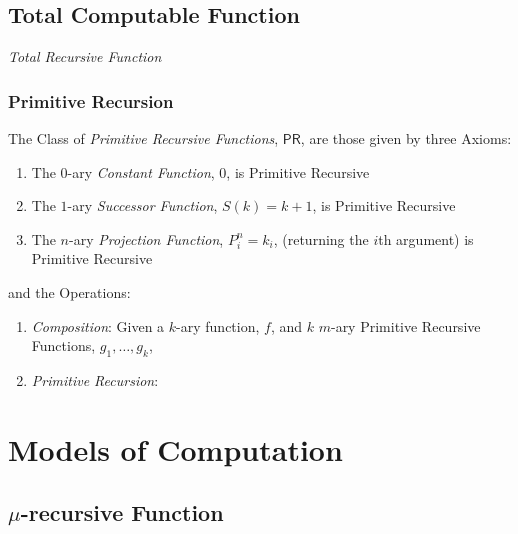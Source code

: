 \documentclass{article}
\begin{document}
\subsection{Total Computable Function}\label{subsec:recursive_function}

\emph{Total Recursive Function}

\subsubsection{Primitive Recursion}\label{subsec:primitive_recursion}

The Class of \emph{Primitive Recursive Functions}, $\mathsf{PR}$, are
those given by three Axioms:
\begin{enumerate}
    \item The $0$-ary \emph{Constant Function}, $0$, is Primitive
      Recursive
    \item The $1$-ary \emph{Successor Function}, $S(k) = k + 1$, is
      Primitive Recursive
    \item The $n$-ary \emph{Projection Function}, $P_i^n = k_i$,
      (returning the $i$th argument) is Primitive Recursive
\end{enumerate}
and the Operations:
\begin{enumerate}
    \item \emph{Composition}: Given a $k$-ary function, $f$, and $k$
      $m$-ary Primitive Recursive Functions, $g_1, \ldots, g_k$,
    \item \emph{Primitive Recursion}:
\end{enumerate}



\section{Models of Computation}\label{sec:computation_model}

\subsection{$\mu$-recursive Function}\label{subsec:mu_recursive}
\end{document}
